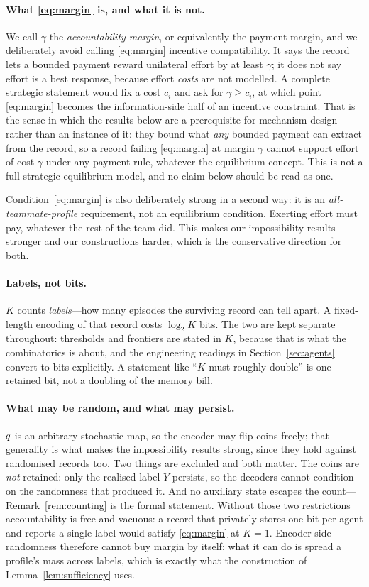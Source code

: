 \paragraph{What \eqref{eq:margin} is, and what it is not.}
We call $\gamma$ the \emph{accountability margin}, or equivalently the payment
margin, and we deliberately avoid calling \eqref{eq:margin} incentive
compatibility. It says the record lets a bounded payment reward unilateral effort
by at least $\gamma$; it does not say effort is a best response, because effort
\emph{costs} are not modelled. A complete strategic statement would fix a cost
$c_i$ and ask for $\gamma \ge c_i$, at which point \eqref{eq:margin} becomes the
information-side half of an incentive constraint. That is the sense in which the
results below are a prerequisite for mechanism design rather than an instance of
it: they bound what \emph{any} bounded payment can extract from the record, so a
record failing \eqref{eq:margin} at margin $\gamma$ cannot support effort of cost
$\gamma$ under any payment rule, whatever the equilibrium concept. This is not a
full strategic equilibrium model, and no claim below should be read as one.

Condition~\eqref{eq:margin} is also deliberately strong in a second way: it is an
\emph{all-teammate-profile} requirement, not an equilibrium condition. Exerting
effort must pay, whatever the rest of the team did. This makes our impossibility
results stronger and our constructions harder, which is the conservative
direction for both.

\paragraph{Labels, not bits.}
$K$ counts \emph{labels}---how many episodes the surviving record can tell
apart. A fixed-length encoding of that record costs $\log_2 K$ bits. The two are
kept separate throughout: thresholds and frontiers are stated in $K$, because
that is what the combinatorics is about, and the engineering readings in
Section~\ref{sec:agents} convert to bits explicitly. A statement like ``$K$ must
roughly double'' is one retained bit, not a doubling of the memory bill.

\paragraph{What may be random, and what may persist.}
$q$ is an arbitrary stochastic map, so the encoder may flip coins freely; that
generality is what makes the impossibility results strong, since they hold
against randomised records too. Two things are excluded and both matter.
The coins are \emph{not} retained: only the realised label $Y$ persists, so the
decoders cannot condition on the randomness that produced it. And no auxiliary
state escapes the count---Remark~\ref{rem:counting} is the formal statement.
Without those two restrictions accountability is free and vacuous: a record that
privately stores one bit per agent and reports a single label would satisfy
\eqref{eq:margin} at $K=1$. Encoder-side randomness therefore cannot buy margin
by itself; what it can do is spread a profile's mass across labels, which is
exactly what the construction of Lemma~\ref{lem:sufficiency} uses.

